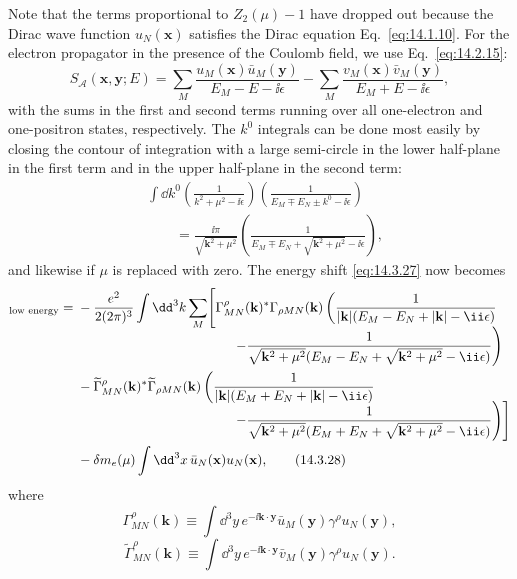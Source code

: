 Note that the terms proportional to $Z_2(\mu)-1$ have dropped out because the
Dirac wave function $u_N(\mathbf x)$ satisfies the Dirac equation
Eq.~\eqref{eq:14.1.10}. For the electron propagator in the presence of the
Coulomb field, we use Eq.~\eqref{eq:14.2.15}:
\[
S_{\mathcal A}(\mathbf x,\mathbf y;E)
=\sum_M\frac{u_M(\mathbf x)\bar u_M(\mathbf y)}{E_M-E-\ii\epsilon}
-\sum_M\frac{v_M(\mathbf x)\bar v_M(\mathbf y)}{E_M+E-\ii\epsilon},
\]
with the sums in the first and second terms running over all one-electron and
one-positron states, respectively. The $k^0$ integrals can be done most easily
by closing the contour of integration with a large semi-circle in the lower
half-plane in the first term and in the upper half-plane in the second term:
\begin{align*}
&\int \dd k^0\left(\frac{1}{k^2+\mu^2-\ii\epsilon}\right)
\left(\frac{1}{E_M\mp E_N\pm k^0-\ii\epsilon}\right)\\
&\qquad={}
\frac{\ii\pi}{\sqrt{\mathbf k^2+\mu^2}}
\left(\frac{1}{E_M\mp E_N+\sqrt{\mathbf k^2+\mu^2}-\ii\epsilon}\right),
\end{align*}
and likewise if $\mu$ is replaced with zero. The energy shift
\eqref{eq:14.3.27} now becomes
\begin{align}
[\delta E_N]_{\text{low energy}}
={}&-\frac{e^2}{2(2\pi)^3}\int \dd^3k\sum_M
\Biggl[\Gamma_{MN}^\rho(\mathbf k)^*\Gamma_{\rho MN}(\mathbf k)
\left(\frac{1}{|\mathbf k|(E_M-E_N+|\mathbf k|-\ii\epsilon)}
\right.\notag\\[-2mm]
&\left.\hspace{41mm}
-\frac{1}{\sqrt{\mathbf k^2+\mu^2}
(E_M-E_N+\sqrt{\mathbf k^2+\mu^2}-\ii\epsilon)}\right)\notag\\
&-\widetilde\Gamma_{MN}^\rho(\mathbf k)^*
\widetilde\Gamma_{\rho MN}(\mathbf k)
\left(\frac{1}{|\mathbf k|(E_M+E_N+|\mathbf k|-\ii\epsilon)}
\right.\notag\\[-2mm]
&\left.\hspace{41mm}
-\frac{1}{\sqrt{\mathbf k^2+\mu^2}
(E_M+E_N+\sqrt{\mathbf k^2+\mu^2}-\ii\epsilon)}\right)\Biggr]
\notag\\
&-\delta m_e(\mu)\int \dd^3x\,\bar u_N(\mathbf x)u_N(\mathbf x),
\tag{14.3.28}\label{eq:14.3.28}
\end{align}
where
\begin{equation}
\Gamma_{MN}^\rho(\mathbf k)
\equiv\int \dd^3y\,e^{-\ii\mathbf k\cdot\mathbf y}
\bar u_M(\mathbf y)\gamma^\rho u_N(\mathbf y),
\tag{14.3.29}\label{eq:14.3.29}
\end{equation}
\begin{equation}
\widetilde\Gamma_{MN}^\rho(\mathbf k)
\equiv\int \dd^3y\,e^{-\ii\mathbf k\cdot\mathbf y}
\bar v_M(\mathbf y)\gamma^\rho u_N(\mathbf y).
\tag{14.3.30}\label{eq:14.3.30}
\end{equation}
